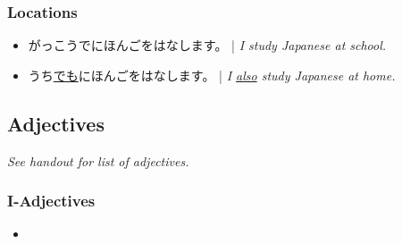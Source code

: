 \documentclass{article}
\begin{document}
\begin{CJK}{UTF8}{min}
\subsubsection{Locations}
\begin{itemize}
\item がっこうでにほんごをはなします。 | \emph{I study Japanese at school.}
\item うち\uline{でも}にほんごをはなします。 | \emph{I \uline{also} study Japanese at home.}
\end{itemize}

\subsection{Adjectives}
\vspace{-3mm}
\emph{See handout for list of adjectives.}

\subsubsection{I-Adjectives}
\begin{itemize}
\item
\end{itemize}



















\end{CJK}
\end{document}
